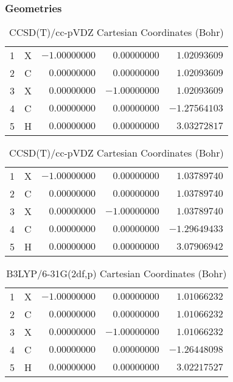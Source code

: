 \documentclass[10pt,oneside]{article}
\begin{document}
\begin{table}[h!]
\subsubsection*{Geometries}
\begin{multicols}{2}
\centering
\caption{CCSD(T)/cc-pVTZ Cartesian Coordinates (Bohr)}
\begin{tabular}{llrrr}
\toprule
1  & X  & $-1.00000000$ & $ 0.00000000$ & $ 1.02093609$ \\
2  & C  & $ 0.00000000$ & $ 0.00000000$ & $ 1.02093609$ \\
3  & X  & $ 0.00000000$ & $-1.00000000$ & $ 1.02093609$ \\
4  & C  & $ 0.00000000$ & $ 0.00000000$ & $-1.27564103$ \\
5  & H  & $ 0.00000000$ & $ 0.00000000$ & $ 3.03272817$ \\
\bottomrule
\end{tabular}
\caption{CCSD(T)/cc-pVDZ Cartesian Coordinates (Bohr)}
\begin{tabular}{llrrr}
\toprule
1  & X  & $-1.00000000$ & $ 0.00000000$ & $ 1.03789740$ \\
2  & C  & $ 0.00000000$ & $ 0.00000000$ & $ 1.03789740$ \\
3  & X  & $ 0.00000000$ & $-1.00000000$ & $ 1.03789740$ \\
4  & C  & $ 0.00000000$ & $ 0.00000000$ & $-1.29649433$ \\
5  & H  & $ 0.00000000$ & $ 0.00000000$ & $ 3.07906942$ \\
\bottomrule
\end{tabular}
\end{multicols}
\end{table}

\begin{table}[h]
\centering
\caption{B3LYP/6-31G(2df,p) Cartesian Coordinates (Bohr)}
\begin{tabular}{llrrr}
\toprule
1  & X  & $-1.00000000$ & $ 0.00000000$ & $ 1.01066232$ \\
2  & C  & $ 0.00000000$ & $ 0.00000000$ & $ 1.01066232$ \\
3  & X  & $ 0.00000000$ & $-1.00000000$ & $ 1.01066232$ \\
4  & C  & $ 0.00000000$ & $ 0.00000000$ & $-1.26448098$ \\
5  & H  & $ 0.00000000$ & $ 0.00000000$ & $ 3.02217527$ \\
\bottomrule
\end{tabular}
\end{table}
\end{document}
